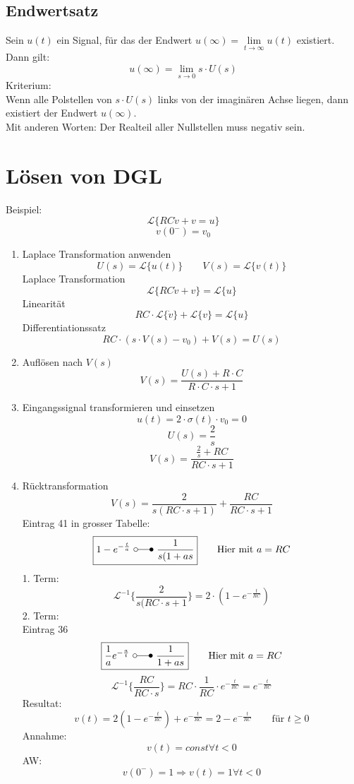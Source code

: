 \subsection{Endwertsatz}
Sein $u(t)$ ein Signal, für das der Endwert 
$u(\infty) = \lim\limits_{t \to \infty} u(t)$ existiert. \\
Dann gilt: 
\[ u(\infty) = \lim\limits_{s \to 0} s \cdot U(s) \]
Kriterium: \\
Wenn alle Polstellen von $s \cdot U(s)$ links von der imaginären Achse liegen, 
dann existiert der Endwert $u(\infty)$. \\
Mit anderen Worten: Der Realteil aller Nullstellen muss negativ sein. 

\section{Lösen von DGL}
Beispiel:
\[ \mathcal{L} \{ R C \dot{v} + v = u \} \]
\[ v(0^-) = v_0 \]
\begin{enumerate}
  \item Laplace Transformation anwenden
        \[ U(s) = \mathcal{L} \{ u(t) \} \qquad V(s) = \mathcal{L} \{ v(t) \} \]
        Laplace Transformation
        \[ \mathcal{L} \{ R C \dot{v} + v \} = \mathcal{L} \{ u \} \]
        Linearität
        \[ R C \cdot \mathcal{L} \{ \dot{v} \} + \mathcal{L} \{ v \} 
        = \mathcal{L} \{ u \} \]
        Differentiationssatz
        \[ R C \cdot ( s \cdot V(s) - v_0 )  + V(s) = U(s) \]
  \item Auflösen nach $V(s)$
        \[ \boxed{V(s) = \frac{U(s) + R \cdot C}{R \cdot C \cdot s + 1}} \]
  \item Eingangssignal transformieren und einsetzen
        \[ u(t) = 2 \cdot \sigma(t) \cdot v_0 = 0 \]
        \[ U(s) = \frac{2}{s} \]
        \[ V(s) = \frac{\frac{2}{s} + RC}{RC \cdot s + 1} \]
  \item Rücktransformation
        \[ V(s) = \frac{2}{s (RC \cdot s + 1)}  + \frac{RC}{RC \cdot s + 1} \]
        Eintrag 41 in grosser Tabelle: 
        \[ \boxed{1 - e^{-\frac{t}{a}} ~ \laplace ~ \frac{1}{s(1 + a s}} 
        \qquad \text{Hier mit }a = RC \]
        1. Term: 
        \[ \mathcal{L}^{-1} \{ \frac{2}{s(RC \cdot s + 1} \} 
        = 2 \cdot (1 - e^{-\frac{t}{RC}}) \]
        2. Term: \\
        Eintrag 36
        \[ \boxed{\frac{1}{a} e^{-\frac{a}{t}} ~ \laplace ~ \frac{1}{1 + a s}} 
        \qquad \text{Hier mit }a = RC \]
        \[ \mathcal{L}^{-1} \{ \frac{RC}{RC \cdot s} \} 
        = RC \cdot \frac{1}{RC} \cdot e^{-\frac{t}{RC}} = e^{-\frac{t}{RC}} \]
        Resultat: 
        \[ v(t) = 2 (1 - e^{-\frac{t}{RC}}) + e^{-\frac{t}{RC}} 
        = 2 - e^{-\frac{t}{RC}} \qquad \text{für }t \geq 0 \]
        Annahme: 
        \[ v(t) = const \forall t < 0 \]
        AW: 
        \[ v(0^-) = 1 \Rightarrow v(t) = 1 \forall t < 0 \] 
\end{enumerate}
